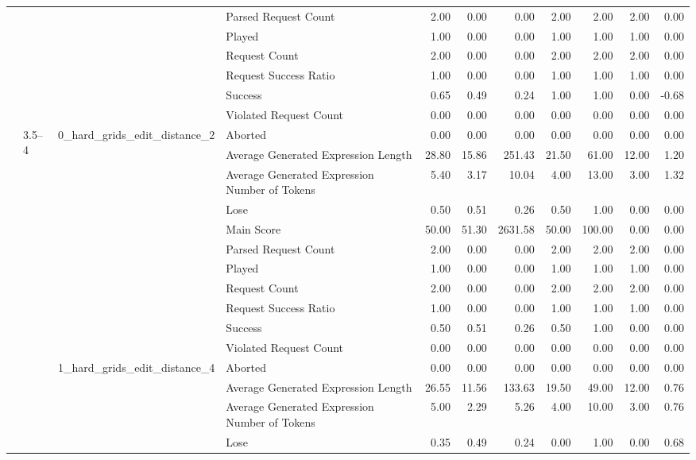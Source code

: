 \begin{tabular}{llllrrrrrrr}
 &  &  & Parsed Request Count & 2.00 & 0.00 & 0.00 & 2.00 & 2.00 & 2.00 & 0.00 \\
 &  &  & Played & 1.00 & 0.00 & 0.00 & 1.00 & 1.00 & 1.00 & 0.00 \\
 &  &  & Request Count & 2.00 & 0.00 & 0.00 & 2.00 & 2.00 & 2.00 & 0.00 \\
 &  &  & Request Success Ratio & 1.00 & 0.00 & 0.00 & 1.00 & 1.00 & 1.00 & 0.00 \\
 &  &  & Success & 0.65 & 0.49 & 0.24 & 1.00 & 1.00 & 0.00 & -0.68 \\
 &  &  & Violated Request Count & 0.00 & 0.00 & 0.00 & 0.00 & 0.00 & 0.00 & 0.00 \\
\cline{2-11} \cline{3-11}
 & \multirow[t]{22}{*}{3.5--4} & \multirow[t]{11}{*}{0_hard_grids_edit_distance_2} & Aborted & 0.00 & 0.00 & 0.00 & 0.00 & 0.00 & 0.00 & 0.00 \\
 &  &  & Average Generated Expression Length & 28.80 & 15.86 & 251.43 & 21.50 & 61.00 & 12.00 & 1.20 \\
 &  &  & Average Generated Expression Number of Tokens & 5.40 & 3.17 & 10.04 & 4.00 & 13.00 & 3.00 & 1.32 \\
 &  &  & Lose & 0.50 & 0.51 & 0.26 & 0.50 & 1.00 & 0.00 & 0.00 \\
 &  &  & Main Score & 50.00 & 51.30 & 2631.58 & 50.00 & 100.00 & 0.00 & 0.00 \\
 &  &  & Parsed Request Count & 2.00 & 0.00 & 0.00 & 2.00 & 2.00 & 2.00 & 0.00 \\
 &  &  & Played & 1.00 & 0.00 & 0.00 & 1.00 & 1.00 & 1.00 & 0.00 \\
 &  &  & Request Count & 2.00 & 0.00 & 0.00 & 2.00 & 2.00 & 2.00 & 0.00 \\
 &  &  & Request Success Ratio & 1.00 & 0.00 & 0.00 & 1.00 & 1.00 & 1.00 & 0.00 \\
 &  &  & Success & 0.50 & 0.51 & 0.26 & 0.50 & 1.00 & 0.00 & 0.00 \\
 &  &  & Violated Request Count & 0.00 & 0.00 & 0.00 & 0.00 & 0.00 & 0.00 & 0.00 \\
\cline{3-11}
 &  & \multirow[t]{11}{*}{1_hard_grids_edit_distance_4} & Aborted & 0.00 & 0.00 & 0.00 & 0.00 & 0.00 & 0.00 & 0.00 \\
 &  &  & Average Generated Expression Length & 26.55 & 11.56 & 133.63 & 19.50 & 49.00 & 12.00 & 0.76 \\
 &  &  & Average Generated Expression Number of Tokens & 5.00 & 2.29 & 5.26 & 4.00 & 10.00 & 3.00 & 0.76 \\
 &  &  & Lose & 0.35 & 0.49 & 0.24 & 0.00 & 1.00 & 0.00 & 0.68 \\

\end{tabular}
